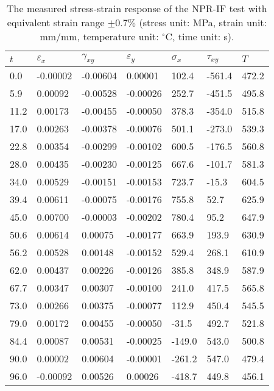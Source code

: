 \begin{table}[htbp]
  \centering
  \caption{The measured stress-strain response of the NPR-IF test with equivalent strain range $\pm0.7\%$ (stress unit: MPa, strain unit: mm/mm, temperature unit: $^\circ$C, time unit: s).}
    \begin{tabular}{p{1.5cm}p{1.5cm}p{1.5cm}p{1.5cm}p{1.5cm}p{1.5cm}p{1.5cm}}
    \toprule
    $t$   & $\varepsilon_x$ & $\gamma_{xy}$ & $\varepsilon_y$ & $\sigma_x$ & $\tau_{xy}$ & $T$ \\
    \midrule
    0.0   & -0.00002  & -0.00604  & 0.00001  & 102.4  & -561.4  & 472.2  \\
    5.9   & 0.00092  & -0.00528  & -0.00026  & 252.7  & -451.5  & 495.8  \\
    11.2  & 0.00173  & -0.00455  & -0.00050  & 378.3  & -354.0  & 515.8  \\
    17.0  & 0.00263  & -0.00378  & -0.00076  & 501.1  & -273.0  & 539.3  \\
    22.8  & 0.00354  & -0.00299  & -0.00102  & 600.5  & -176.5  & 560.8  \\
    28.0  & 0.00435  & -0.00230  & -0.00125  & 667.6  & -101.7  & 581.3  \\
    34.0  & 0.00529  & -0.00151  & -0.00153  & 723.7  & -15.3  & 604.5  \\
    39.4  & 0.00611  & -0.00075  & -0.00176  & 755.8  & 52.7  & 625.9  \\
    45.0  & 0.00700  & -0.00003  & -0.00202  & 780.4  & 95.2  & 647.9  \\
    50.6  & 0.00614  & 0.00075  & -0.00177  & 663.9  & 193.9  & 630.9  \\
    56.2  & 0.00528  & 0.00148  & -0.00152  & 529.4  & 268.1  & 610.9  \\
    62.0  & 0.00437  & 0.00226  & -0.00126  & 385.8  & 348.9  & 587.9  \\
    67.7  & 0.00347  & 0.00307  & -0.00100  & 241.0  & 417.5  & 565.8  \\
    73.0  & 0.00266  & 0.00375  & -0.00077  & 112.9  & 450.4  & 545.5  \\
    79.0  & 0.00172  & 0.00455  & -0.00050  & -31.5  & 492.7  & 521.8  \\
    84.4  & 0.00087  & 0.00531  & -0.00025  & -149.0  & 543.0  & 500.8  \\
    90.0  & 0.00002  & 0.00604  & -0.00001  & -261.2  & 547.0  & 479.4  \\
    96.0  & -0.00092  & 0.00526  & 0.00026  & -418.7  & 449.8  & 456.1  \\

\end{tabular}
\end{table}
